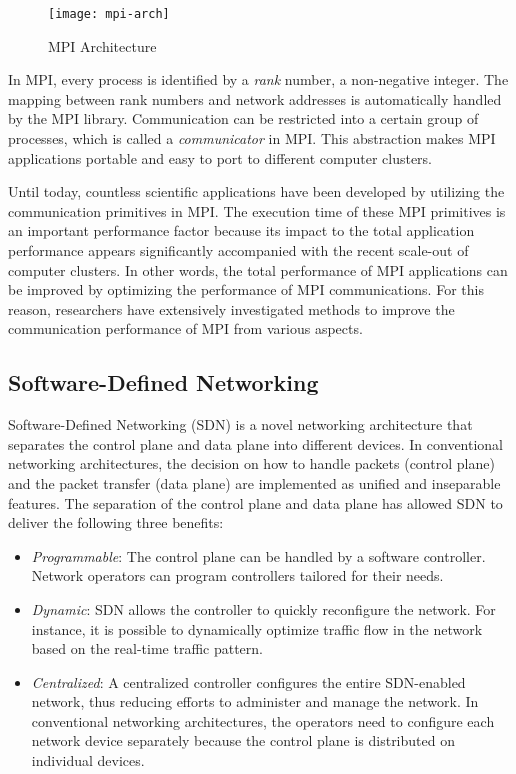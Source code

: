 \begin{figure}
    \centering
    \texttt{[image: mpi-arch]}
    \caption{MPI Architecture}%
    \label{fig:mpi-arch}
\end{figure}

In MPI, every process is identified by a \emph{rank} number, a non-negative
integer. The mapping between rank numbers and network addresses is
automatically handled by the MPI library. Communication can be restricted into
a certain group of processes, which is called a \emph{communicator} in MPI\@.
This abstraction makes MPI applications portable and easy to port to different
computer clusters.

Until today, countless scientific applications have been developed by
utilizing the communication primitives in MPI\@. The execution time of
these MPI primitives is an important performance factor because its
impact to the total application performance appears significantly
accompanied with the recent scale-out of computer clusters. In other
words, the total performance of MPI applications can be improved by
optimizing the performance of MPI communications. For this reason,
researchers have extensively investigated methods to improve the
communication performance of MPI from various aspects.

\subsection{Software-Defined Networking}

Software-Defined Networking (SDN) is a novel networking architecture
that separates the control plane and data plane into different devices.
In conventional networking architectures, the decision on how to handle
packets (control plane) and the packet transfer (data plane) are
implemented as unified and inseparable features. The separation of the
control plane and data plane has allowed SDN to deliver the following
three benefits:

\begin{itemize}
\item
  \emph{Programmable}: The control plane can be handled by a software
  controller. Network operators can program controllers tailored for
  their needs.
\item
  \emph{Dynamic}: SDN allows the controller to quickly reconfigure the
  network. For instance, it is possible to dynamically optimize traffic
  flow in the network based on the real-time traffic pattern.
\item
  \emph{Centralized}: A centralized controller configures the entire
  SDN-enabled network, thus reducing efforts to administer and manage
  the network. In conventional networking architectures, the operators
  need to configure each network device separately because the control
  plane is distributed on individual devices.
\end{itemize}

